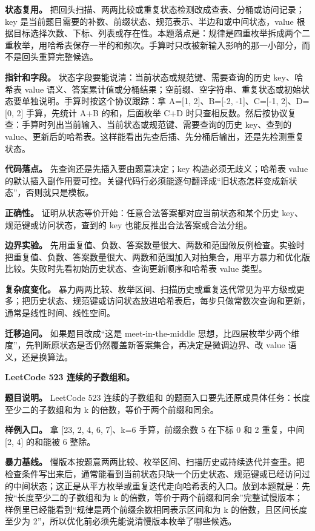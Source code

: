 \textbf{状态复用。} 把回头扫描、两两比较或重复状态检测改成查表、分桶或访问记录；key 是当前题目需要的补数、前缀状态、规范表示、半边和或中间状态，value 根据目标选择次数、下标、列表或存在性。本题落点是：规律是四重枚举拆成两个二重枚举，用哈希表保存一半的和频次。手算时只改被新输入影响的那一小部分，而不是回头重算完整候选。

\textbf{指针和字段。} 状态字段要能说清：当前状态或规范键、需要查询的历史 key、哈希表 value 语义、答案累计值或分桶结果；空前缀、空字符串、重复状态或初始状态要单独说明。手算时按这个协议跟踪：拿 A=[1, 2]、B=[-2, -1]、C=[-1, 2]、D=[0, 2] 手算，先统计 A+B 的和，后面枚举 C+D 时只查相反数。然后按协议复查：手算时列出当前输入、当前状态或规范键、需要查询的历史 key、查到的 value、更新后的哈希表。这样能看出先查后插、先分桶后输出，还是先检测重复状态。

\textbf{代码落点。} 先查询还是先插入要由题意决定；key 构造必须无歧义；哈希表 value 的默认插入副作用要可控。关键代码行必须能逐句翻译成“旧状态怎样变成新状态”，否则就只是模板。

\textbf{正确性。} 证明从状态等价开始：任意合法答案都对应当前状态和某个历史 key、规范键或访问状态，查到的 key 也能反推出合法答案或合法分组。

\textbf{边界实验。} 先用重复值、负数、答案数量很大、两数和范围做反例检查。实验时把重复值、负数、答案数量很大、两数和范围加入对拍集合，用平方暴力和优化版比较。失败时先看初始历史状态、查询更新顺序和哈希表 value 类型。

\textbf{复杂度变化。} 暴力两两比较、枚举区间、扫描历史或重复迭代常见为平方级或更多；把历史状态、规范键或访问状态放进哈希表后，每步只做常数次查询和更新，通常是线性时间、线性空间。

\textbf{迁移追问。} 如果题目改成“这是 meet-in-the-middle 思想，比四层枚举少两个维度”，先判断原状态是否仍然覆盖新答案集合，再决定是微调边界、改 value 语义，还是换算法。

\noindent\textbf{LeetCode 523 连续的子数组和。}

\textbf{题目说明。} LeetCode 523 连续的子数组和 的题面入口要先还原成具体任务：长度至少二的子数组和为 k 的倍数，等价于两个前缀和同余。

\textbf{样例入口。} 拿 [23, 2, 4, 6, 7]、k=6 手算，前缀余数 5 在下标 0 和 2 重复，中间 [2, 4] 的和能被 6 整除。

\textbf{暴力基线。} 慢版本按题意两两比较、枚举区间、扫描历史或持续迭代并查重。把检查条件写出来后，通常能看到当前状态只缺一个历史状态、规范键或已经访问过的中间状态；这正是从平方枚举或重复迭代走向哈希表的入口。放到本题就是：先按“长度至少二的子数组和为 k 的倍数，等价于两个前缀和同余”完整试慢版本；样例里已经能看到“规律是两个前缀余数相同表示区间和为 k 的倍数，且区间长度至少为 2”，所以优化前必须先能说清慢版本枚举了哪些候选。

